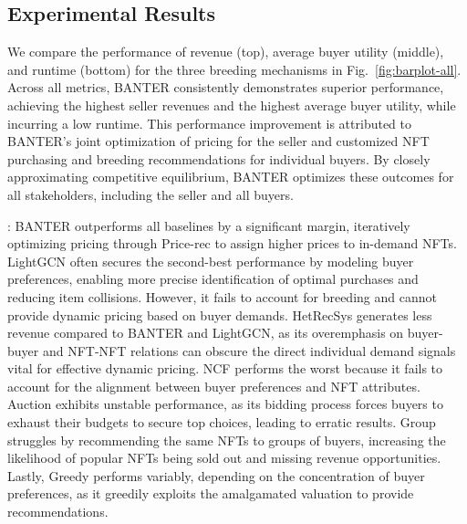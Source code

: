 \documentclass[conference]{IEEEtran}
\theoremstyle{plain}
\begin{document}
\subsection{Experimental Results} 
\label{subsec:exp-main}

We compare the performance of revenue (top), average buyer utility (middle), and runtime (bottom) for the three breeding mechanisms in Fig.~\ref{fig:barplot-all}. Across all metrics, BANTER consistently demonstrates superior performance, achieving the highest seller revenues and the highest average buyer utility, while incurring a low runtime. This performance improvement is attributed to BANTER's joint optimization of pricing for the seller and customized NFT purchasing and breeding recommendations for individual buyers. By closely approximating competitive equilibrium, BANTER optimizes these outcomes for all stakeholders, including the seller and all buyers.

\noindentRevenue: BANTER outperforms all baselines by a significant margin, iteratively optimizing pricing through Price-rec to assign higher prices to in-demand NFTs. LightGCN often secures the second-best performance by modeling buyer preferences, enabling more precise identification of optimal purchases and reducing item collisions. However, it fails to account for breeding and cannot provide dynamic pricing based on buyer demands. HetRecSys generates less revenue compared to BANTER and LightGCN, as its overemphasis on buyer-buyer and NFT-NFT relations can obscure the direct individual demand signals vital for effective dynamic pricing. NCF performs the worst because it fails to account for the alignment between buyer preferences and NFT attributes. Auction exhibits unstable performance, as its bidding process forces buyers to exhaust their budgets to secure top choices, leading to erratic results. Group struggles by recommending the same NFTs to groups of buyers, increasing the likelihood of popular NFTs being sold out and missing revenue opportunities. Lastly, Greedy performs variably, depending on the concentration of buyer preferences, as it greedily exploits the amalgamated valuation to provide recommendations.
\end{document}
